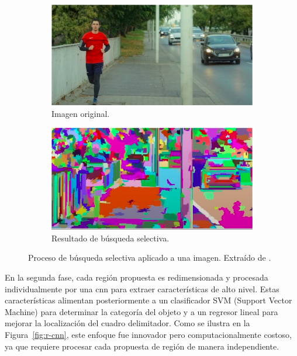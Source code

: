\documentclass[11pt,spanish,listoffigures,listoftables]{tfgetsinf}
\begin{document}
\begin{figure}[H]
   \centering
   \begin{subfigure}[b]{0.45\textwidth}
      \centering
      \includegraphics[width=\textwidth]{images/estado_del_arte/selective_search_original.png}
      \caption{Imagen original.}
      \label{fig:selective_search_original}
   \end{subfigure}
   \hfill
   \begin{subfigure}[b]{0.45\textwidth}
      \centering
      \includegraphics[width=\textwidth]{images/estado_del_arte/selective_search_result.png}
      \caption{Resultado de búsqueda selectiva.}     
      \label{fig:selective_search_result}
   \end{subfigure}
   \caption[Proceso de búsqueda selectiva aplicado a una imagen]{Proceso de búsqueda selectiva aplicado a una imagen. Extraído de \cite{explainningAI}.}
   \label{fig:selective_search}
\end{figure}

En la segunda fase, cada región propuesta es redimensionada y procesada individualmente por una \gls{cnn} para extraer características de alto nivel. Estas características alimentan posteriormente a un clasificador SVM (Support Vector Machine) para determinar la categoría del objeto y a un regresor lineal para mejorar la localización del cuadro delimitador. Como se ilustra en la Figura~\ref{fig:r-cnn}, este enfoque fue innovador pero computacionalmente costoso, ya que requiere procesar cada propuesta de región de manera independiente.
\end{document}
